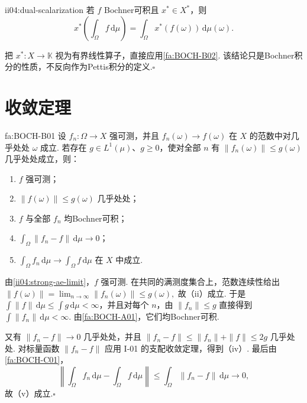 \begin{FACorollary}[C][对偶标量化]{ii04:dual-scalarization}
若 \(\displaystyle f\) Bochner可积且 \(\displaystyle x^*\in X^*\)，则
\[
x^*\left(\int_\Omega f\,\mathrm{d}\mu\right)
=
\int_\Omega x^*(f(\omega))\,\mathrm{d}\mu(\omega).
\]
\end{FACorollary}

\begin{FAProof}
把 \(\displaystyle x^*:X\to\mathbb K\) 视为有界线性算子，直接应用\autoref{fa:BOCH-B02}. 该结论只是Bochner积分的性质，不反向作为Pettis积分的定义.\hfill\(\square\)
\end{FAProof}

\newpage
\section{收敛定理}\label{sec:ii04-convergence}

\begin{FATheorem}[B][Bochner支配收敛定理]{fa:BOCH-B01}
设 \(\displaystyle f_n:\Omega\to X\) 强可测，并且
\(\displaystyle f_n(\omega)\longrightarrow f(\omega)\)
在 \(\displaystyle X\) 的范数中对几乎处处 \(\displaystyle\omega\) 成立. 若存在 \(\displaystyle g\in L^1(\mu)\)、\(\displaystyle g\geqslant0\)，使对全部 \(\displaystyle n\) 有
\(\displaystyle \|f_n(\omega)\|\leqslant g(\omega)\)
几乎处处成立，则：
\begin{enumerate}[label=\textnormal{(\roman*)}]
\item \(\displaystyle f\) 强可测；
\item \(\displaystyle\|f(\omega)\|\leqslant g(\omega)\) 几乎处处；
\item \(\displaystyle f\) 与全部 \(\displaystyle f_n\) 均Bochner可积；
\item \(\displaystyle\int_\Omega\|f_n-f\|\,\mathrm{d}\mu\to0\)；
\item \(\displaystyle\int_\Omega f_n\,\mathrm{d}\mu\to\int_\Omega f\,\mathrm{d}\mu\) 在 \(\displaystyle X\) 中成立.
\end{enumerate}
\end{FATheorem}

\begin{FAProof}
由\autoref{ii04:strong-ae-limit}，\(\displaystyle f\) 强可测. 在共同的满测度集合上，范数连续性给出
\(\displaystyle \|f(\omega)\| = \lim_{n\to\infty}\|f_n(\omega)\| \leqslant g(\omega),\)
故（ii）成立. 于是 \(\displaystyle\int\|f\|\,\mathrm{d}\mu\leqslant\int g\,\mathrm{d}\mu<\infty\)，并且对每个 \(\displaystyle n\)，由 \(\displaystyle\|f_n\|\leqslant g\) 直接得到 \(\displaystyle\int\|f_n\|\,\mathrm{d}\mu<\infty\). 由\autoref{fa:BOCH-A01}，它们均Bochner可积.

又有 \(\displaystyle\|f_n-f\|\to0\) 几乎处处，并且
\(\displaystyle \|f_n-f\| \leqslant \|f_n\|+\|f\| \leqslant 2g\)
几乎处处. 对标量函数 \(\displaystyle\|f_n-f\|\) 应用 I-01 的支配收敛定理，得到（iv）. 最后由\autoref{fa:BOCH-C01}，
\[
\left\|\int_\Omega f_n\,\mathrm{d}\mu-
\int_\Omega f\,\mathrm{d}\mu\right\|
\leqslant
\int_\Omega\|f_n-f\|\,\mathrm{d}\mu
\longrightarrow0,
\]
故（v）成立.\hfill\(\square\)
\end{FAProof}


